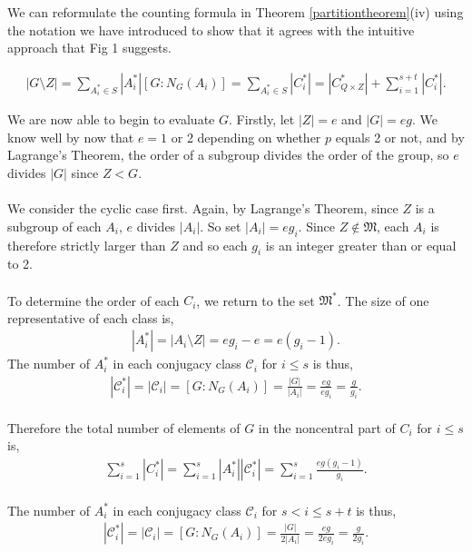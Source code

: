 
We can reformulate the counting formula in Theorem \ref{partitiontheorem}(iv) using the notation we have introduced to show that it agrees with the intuitive approach that Fig 1 suggests.

\begin{align*} |G \! \setminus \! Z| = \sum_{A_i^* \in S} |A_i^*| [G:N_G(A_i)] = \sum_{A_i^* \in S} |C_i^*| = |C_{Q \times Z}^*| + \sum_{i=1}^{s+t} |C_i^*|.
\end{align*}

We are now able to begin to evaluate $G$. Firstly, let $|Z| = e$ and $|G| = eg$. We know well by now that $e = 1$ or 2 depending on whether $p$ equals 2 or not, and by Lagrange's Theorem, the order of a subgroup divides the order of the group, so $e$ divides $|G|$ since $Z < G$. \\
\\
We consider the cyclic case first. Again, by Lagrange's Theorem, since $Z$ is a subgroup of each $A_i$, $e$ divides $|A_i|$. So set $|A_i| = eg_i$. Since $Z \notin \mathfrak{M}$, each $A_i$ is therefore strictly larger than $Z$ and so each $g_i$ is an integer greater than or equal to 2. \\
\\
To determine the order of each $C_i$, we return to the set $\mathfrak{M}^*$. The size of one representative of each class is,
\begin{align*} |A_i^*| = |A_i \! \setminus \! Z| = eg_i-e = e(g_i-1). \end{align*}
The number of $A_i^*$ in each conjugacy class $\mathcal{C}_i$ for $i \leq s$ is thus,
\begin{align*} |\mathcal{C}_i^*| = |\mathcal{C}_i| = [G:N_G(A_i)] = \frac{|G|}{|A_i|} = \frac{eg}{eg_i} = \frac{g}{g_i}. \end{align*}
\\
Therefore the total number of elements of $G$ in the noncentral part of $C_i$ for $i \leq s$ is,
\begin{align} \label{classeq1of3} \sum_{i=1}^{s} |C_i^*| = \sum_{i=1}^{s} |A_i^*| |\mathcal{C}_i^*| = \sum_{i=1}^{s} \frac{eg(g_i-1)}{g_i}.
\end{align}
\\
The number of $A_i^*$ in each conjugacy class $\mathcal{C}_i$ for $s < i \leq s+t$ is thus,
\begin{align*} |\mathcal{C}_i^*| = |\mathcal{C}_i| = [G:N_G(A_i)] = \frac{|G|}{2|A_i|} = \frac{eg}{2eg_i} = \frac{g}{2g_i}. \end{align*}
